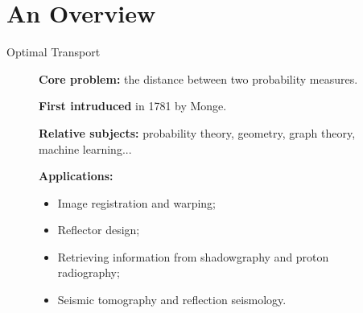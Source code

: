 \section{An Overview}

\begin{frame}{Optimal Transport}
    \scriptsize
    \vspace{-1.5em}
    \begin{figure}
        \begin{minipage}[t]{0.6\linewidth}
            \vspace{0pt}
            \textbf{Core problem:} the distance between two probability measures.

            \textbf{First intruduced} in 1781 by Monge.

            \textbf{Relative subjects:} probability theory, geometry, graph theory, machine learning...

            \textbf{Applications:}
            \begin{itemize}
                \item Image registration and warping;
                \item Reflector design;
                \item Retrieving information from shadowgraphy and proton radiography;
                \item Seismic tomography and reflection seismology.
            \end{itemize}


\end{minipage}
\end{figure}
\end{frame}
